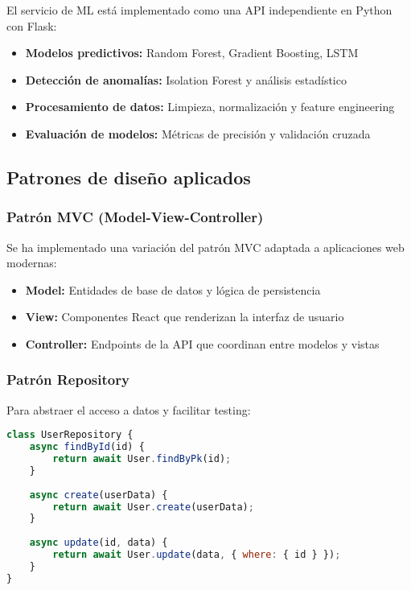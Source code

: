 El servicio de ML está implementado como una API independiente en Python con Flask:

\begin{itemize}
    \item \textbf{Modelos predictivos:} Random Forest, Gradient Boosting, LSTM
    \item \textbf{Detección de anomalías:} Isolation Forest y análisis estadístico
    \item \textbf{Procesamiento de datos:} Limpieza, normalización y feature engineering
    \item \textbf{Evaluación de modelos:} Métricas de precisión y validación cruzada
\end{itemize}

\subsection{Patrones de diseño aplicados}

\subsubsection{Patrón MVC (Model-View-Controller)}

Se ha implementado una variación del patrón MVC adaptada a aplicaciones web modernas:

\begin{itemize}
    \item \textbf{Model:} Entidades de base de datos y lógica de persistencia
    \item \textbf{View:} Componentes React que renderizan la interfaz de usuario
    \item \textbf{Controller:} Endpoints de la API que coordinan entre modelos y vistas
\end{itemize}

\subsubsection{Patrón Repository}

Para abstraer el acceso a datos y facilitar testing:

\begin{lstlisting}[language=JavaScript, caption=Ejemplo del patrón Repository]
class UserRepository {
    async findById(id) {
        return await User.findByPk(id);
    }
    
    async create(userData) {
        return await User.create(userData);
    }
    
    async update(id, data) {
        return await User.update(data, { where: { id } });
    }
}
\end{lstlisting}

